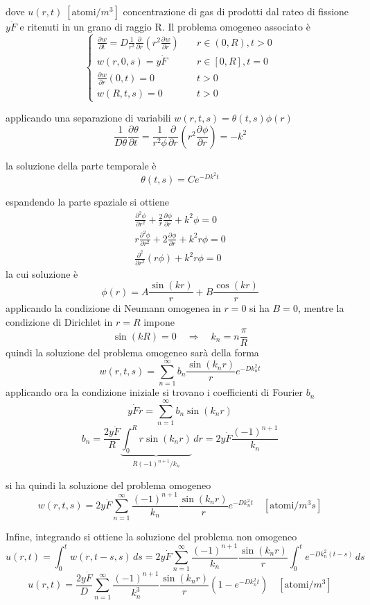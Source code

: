 \documentclass{article}
\newcommand{\pderiv}[3][]{\frac{\partial^{#1} #2}{\partial #3^{#1}}}
\begin{document}
dove \( u(r,t) \; [\text{atomi}/m^3]\) concentrazione di gas di prodotti dal rateo di fissione \(y\dot{F}\) e ritenuti in un grano di raggio R. Il problema omogeneo associato è
\[
\begin{cases}
  \pderiv{w}{t} = D \frac{1}{r^2}\pderiv{}{r}( r^2 \pderiv{w}{r} )  \quad & r \in (0, R), t > 0 \\
  w(r,0,s) = y\dot{F} \quad & r \in [0, R], t = 0 \\
  \pderiv{w}{r}(0,t) = 0 \quad & t > 0\\
  w(R, t, s) = 0 \quad & t > 0
  \end{cases}
\]

applicando una separazione di variabili \(w(r,t,s) = \theta(t,s)\phi(r)\)
\[
  \frac{1}{D\theta}\pderiv{\theta}{t} = \frac{1}{r^2\phi}\pderiv{}{r}( r^2 \pderiv{\phi}{r} ) = -k^2
\]

la soluzione della parte temporale è
\[
  \theta(t,s) = Ce^{-Dk^2t}
\]

espandendo la parte spaziale si ottiene
\begin{align*}
  \pderiv[2]{\phi}{r} + \frac{2}{r}\pderiv{\phi}{r} + k^2\phi = 0\\
  r\pderiv[2]{\phi}{r} + 2\pderiv{\phi}{r} + k^2r\phi = 0\\
  \pderiv[2]{}{r}(r\phi) + k^2r\phi = 0
\end{align*}
la cui soluzione è
\[
  \phi(r) = A\frac{\sin(kr)}{r} + B\frac{\cos(kr)}{r}
\]
applicando la condizione di Neumann omogenea in \(r = 0\) si ha \(B = 0\), mentre la condizione di Dirichlet in \(r = R\) impone
\[
  \sin(kR) = 0 \quad\Rightarrow\quad k_n = n\frac{\pi}{R}
\]
quindi la soluzione del problema omogeneo sarà della forma
\[
  w(r,t,s) = \sum_{n=1}^{\infty} b_n \frac{\sin(k_nr)}{r}e^{-Dk_n^2t}
\]
applicando ora la condizione iniziale si trovano i coefficienti di Fourier \(b_n\)
\[
  y\dot{F}r = \sum_{n=1}^{\infty} b_n \sin(k_nr)
\]
\[
  b_n = \frac{2y\dot{F}}{R}\underbrace{\int_0^R r\sin(k_nr)}_{R(-1)^{n+1} / k_n} \, dr = 2y\dot{F}\frac{(-1)^{n+1}}{k_n}
\]

si ha quindi la soluzione del problema omogeneo
\[
  w(r,t,s) = 2y\dot{F}\sum_{n=1}^{\infty} \frac{(-1)^{n+1}}{k_n}\frac{\sin(k_nr)}{r}e^{-Dk_n^2t} \quad [\text{atomi}/m^3s]
\]

Infine, integrando si ottiene la soluzione del problema non omogeneo
\[
  u(r,t) = \int_0^t w(r,t-s,s) \, ds = 2y\dot{F}\sum_{n=1}^{\infty} \frac{(-1)^{n+1}}{k_n}\frac{\sin(k_nr)}{r}\int_0^t e^{-Dk_n^2(t-s)} \, ds
\]
\[
  u(r,t) = \frac{2y\dot{F}}{D}\sum_{n=1}^{\infty} \frac{(-1)^{n+1}}{k_n^3}\frac{\sin(k_nr)}{r}\left(1 - e^{-Dk_n^2t}\right)\quad [\text{atomi}/m^3]
\]
\end{document}
